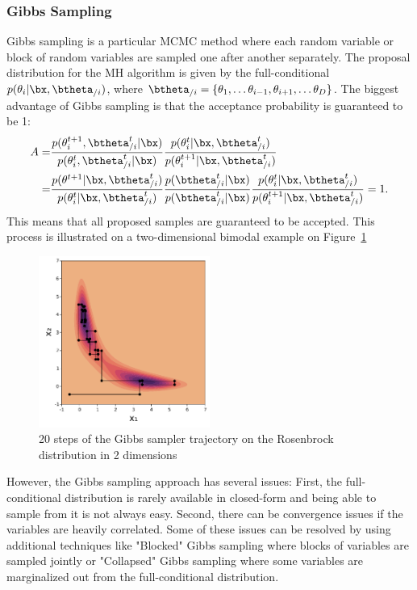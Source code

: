 \subsubsection{Gibbs Sampling}

Gibbs sampling is a particular \ac{MCMC} method where each random variable or block of random variables are sampled one after another separately.
The proposal distribution for the \ac{MH} algorithm is given by the full-conditional  $p(\theta_i|\bx,\btheta_{/i})$, where $\btheta_{/i}=\{\theta_1, \ldots \theta_{i-1}, \theta_{i+1},\ldots \theta_{D}\}$.
The biggest advantage of Gibbs sampling is that the acceptance probability is guaranteed to be 1:
\begin{align*}
    A =& \frac{p(\theta^{t+1}_i,\btheta^t_{/i}|\bx)}{p(\theta^t_i,\btheta^t_{/i}|\bx)}\frac{p(\theta^t_i|\bx,\btheta^{t}_{/i})}{p(\theta^{t+1}_i|\bx,\btheta^t_{/i})}\\
    =& \frac{p(\theta^{t+1}|\bx, \btheta^{t}_{/i})}{p(\theta^t_i|\bx,\btheta^t_{/i})}\frac{p(\btheta^t_{/i}|\bx)}{p(\btheta^t_{/i}|\bx)}\frac{p(\theta^t_i|\bx,\btheta^{t}_{/i})}{p(\theta^{t+1}_i|\bx,\btheta^t_{/i})} = 1.
\end{align*}
This means that all proposed samples are guaranteed to be accepted.
This process is illustrated on a two-dimensional bimodal example on Figure~\ref{fig:gibbs_samp}

\begin{figure}
\centering
\includegraphics[width=0.5\textwidth]{./chapters/2_background/figures/gibbs_sampling.pdf}
\caption{20 steps of the Gibbs sampler trajectory on the Rosenbrock distribution in 2 dimensions}
\label{fig:gibbs_samp}
\end{figure}

However, the Gibbs sampling approach has several issues:
First, the full-conditional distribution is rarely available in closed-form and being able to sample from it is not always easy.
Second, there can be convergence issues if the variables are heavily correlated.
Some of these issues can be resolved by using additional techniques like "Blocked" Gibbs sampling \needcite where blocks of variables are sampled jointly or "Collapsed" Gibbs sampling \needcite where some variables are marginalized out from the full-conditional distribution.

